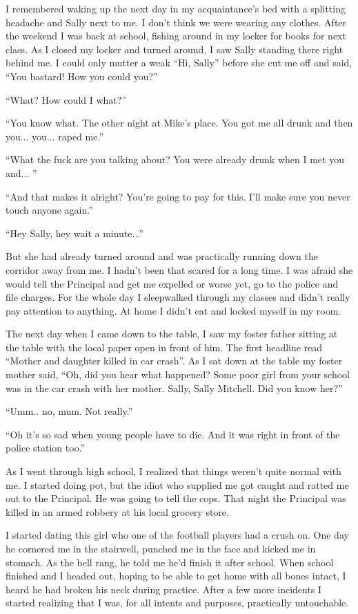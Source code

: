 \documentclass[11pt,letterpaper]{article}
\begin{document}
I remembered waking up the next day in my acquaintance's bed with a splitting headache and Sally next to me. I don't think we were wearing any clothes. After the weekend I was back at school, fishing around in my locker for books for next class. As I closed my locker and turned around, I saw Sally standing there right behind me. I could only mutter a weak ``Hi, Sally'' before she cut me off and said, ``You bastard! How you could you?''

``What? How could I what?''

``You know what. The other night at Mike's place. You got me all drunk and then you... you... raped me.''

``What the fuck are you talking about? You were already drunk when I met you and... ''

``And that makes it alright? You're going to pay for this. I'll make sure you never touch anyone again.''

``Hey Sally, hey wait a minute...''

But she had already turned around and was practically running down the corridor away from me. I hadn't been that scared for a long time. I was afraid she would tell the Principal and get me expelled or worse yet, go to the police and file charges. For the whole day I sleepwalked through my classes and didn't really pay attention to anything. At home I didn't eat and locked myself in my room.

The next day when I came down to the table, I saw my foster father sitting at the table with the local paper open in front of him. The first headline read ``Mother and daughter killed in car crash''. As I sat down at the table my foster mother said, ``Oh, did you hear what happened? Some poor girl from your school was in the car crash with her mother. Sally, Sally Mitchell. Did you know her?''

``Umm.. no, mum. Not really.''

``Oh it's so sad when young people have to die. And it was right in front of the police station too.''


As I went through high school, I realized that things weren't quite normal with me. I started doing pot, but the idiot who supplied me got caught and ratted me out to the Principal. He was going to tell the cops. That night the Principal was killed in an armed robbery at his local grocery store. 

I started dating this girl who one of the football players had a crush on. One day he cornered me in the stairwell, punched me in the face and kicked me in stomach. As the bell rang, he told me he'd finish it after school. When school finished and I headed out, hoping to be able to get home with all bones intact, I heard he had broken his neck during practice. After a few more incidents I started realizing that I was, for all intents and purposes, practically untouchable.
\end{document}

